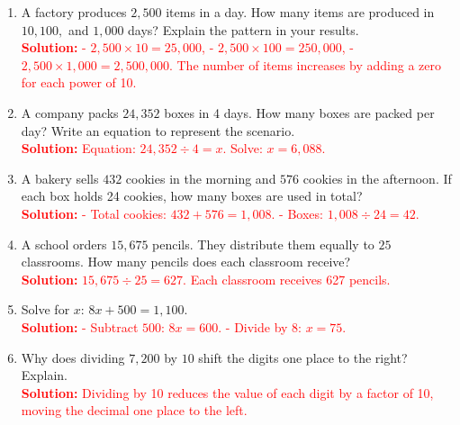 \documentclass[12pt]{article}
\begin{document}
\begin{tcolorbox}[colframe=black!60, colback=white, 
coltitle=black, colbacktitle=black!15, fonttitle=\bfseries\Large, 
title=Problems, halign title=center, left=10pt, right=10pt, top=10pt, bottom=100pt]
\begin{enumerate}[start=9, itemsep=3em]
    \item A factory produces \( 2,500 \) items in a day. How many items are produced in \( 10, 100, \) and \( 1,000 \) days? Explain the pattern in your results.\\
    \textcolor{red}{\textbf{Solution:} 
    - \( 2,500 \times 10 = 25,000 \), 
    - \( 2,500 \times 100 = 250,000 \), 
    - \( 2,500 \times 1,000 = 2,500,000 \). 
    The number of items increases by adding a zero for each power of 10.}

    \item A company packs \( 24,352 \) boxes in 4 days. How many boxes are packed per day? Write an equation to represent the scenario.\\
    \textcolor{red}{\textbf{Solution:} 
    Equation: \( 24,352 \div 4 = x \). Solve: \( x = 6,088 \).}

    \item A bakery sells \( 432 \) cookies in the morning and \( 576 \) cookies in the afternoon. If each box holds 24 cookies, how many boxes are used in total?\\
    \textcolor{red}{\textbf{Solution:} 
    - Total cookies: \( 432 + 576 = 1,008 \). 
    - Boxes: \( 1,008 \div 24 = 42 \).}

    \item A school orders \( 15,675 \) pencils. They distribute them equally to \( 25 \) classrooms. How many pencils does each classroom receive?\\
    \textcolor{red}{\textbf{Solution:} 
    \( 15,675 \div 25 = 627 \). Each classroom receives 627 pencils.}

    \item Solve for \( x \): \( 8x + 500 = 1,100 \).\\
    \textcolor{red}{\textbf{Solution:} 
    - Subtract \( 500 \): \( 8x = 600 \). 
    - Divide by \( 8 \): \( x = 75 \).}

    \item Why does dividing \( 7,200 \) by \( 10 \) shift the digits one place to the right? Explain.\\
    \textcolor{red}{\textbf{Solution:} 
    Dividing by 10 reduces the value of each digit by a factor of 10, moving the decimal one place to the left.}
\end{enumerate}
\end{tcolorbox}
\end{document}
